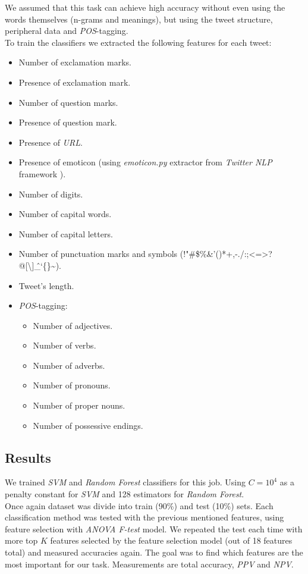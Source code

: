 \documentclass[letterpaper,twocolumn,10pt]{article}
\begin{document}
We assumed that this task can achieve high accuracy without even using the words themselves (n-grams and meanings), but using the tweet structure, peripheral data and \textit{POS}-tagging. \\
To train the classifiers we extracted the following features for each tweet:
\begin{itemize}
	\item Number of exclamation marks.
	\item Presence of exclamation mark.
	\item Number of question marks.
	\item Presence of question mark.
	\item Presence of \textit{URL}.
	\item Presence of emoticon (using \textit{emoticon.py} extractor from \textit{Twitter NLP} framework \cite{twitter_nlp}).
	\item Number of digits.
	\item Number of capital words.
	\item Number of capital letters.
	\item Number of punctuation marks and symbols (!"\#\$\%\&'()*+,-./:;<=>?@[\textbackslash]\^\_`\{\}\textasciitilde).
	\item Tweet's length.
	\item \textit{POS}-tagging:
		\begin{itemize}
			\item Number of adjectives.
			\item Number of verbs.
			\item Number of adverbs.
			\item Number of pronouns.
			\item Number of proper nouns.
			\item Number of possessive endings.
		\end{itemize}
\end{itemize}

\subsection{Results}
We trained \textit{SVM} and \textit{Random Forest} classifiers for this job. Using $ C=10^4 $ as a penalty constant for \textit{SVM} and 128 estimators for \textit{Random Forest}.\\
Once again dataset was divide into train (90\%) and test (10\%) sets. Each classification method was tested with the previous mentioned features, using feature selection with \textit{ANOVA F-test} model. We repeated the test each time with more top $ K $ features selected by the feature selection model (out of 18 features total) and measured accuracies again. The goal was to find which features are the most important for our task. Measurements are total accuracy, \textit{PPV} and \textit{NPV}.\\
\end{document}
